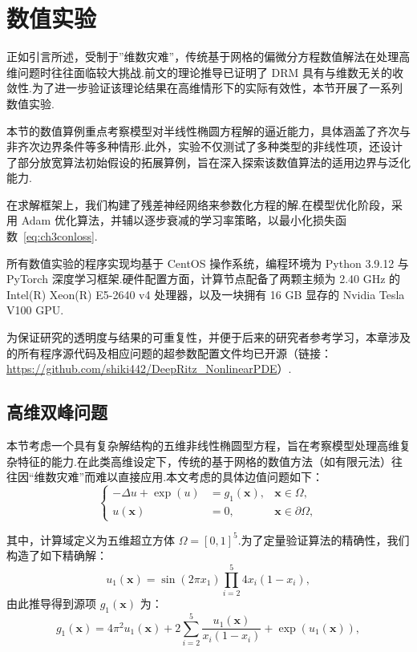\section{数值实验}\label{sec:num}
正如引言所述，受制于”维数灾难”，传统基于网格的偏微分方程数值解法在处理高维问题时往往面临较大挑战.前文的理论推导已证明了 DRM 具有与维数无关的收敛性.为了进一步验证该理论结果在高维情形下的实际有效性，本节开展了一系列数值实验.

本节的数值算例重点考察模型对半线性椭圆方程解的逼近能力，具体涵盖了齐次与非齐次边界条件等多种情形.此外，实验不仅测试了多种类型的非线性项，还设计了部分放宽算法初始假设的拓展算例，旨在深入探索该数值算法的适用边界与泛化能力.

在求解框架上，我们构建了残差神经网络来参数化方程的解.在模型优化阶段，采用 Adam 优化算法，并辅以逐步衰减的学习率策略，以最小化损失函数~\eqref{eq:ch3conloss}.

所有数值实验的程序实现均基于 CentOS 操作系统，编程环境为 Python 3.9.12 与 PyTorch 深度学习框架.硬件配置方面，计算节点配备了两颗主频为 2.40 GHz 的 Intel(R) Xeon(R) E5-2640 v4 处理器，以及一块拥有 16 GB 显存的 Nvidia Tesla V100 GPU.

为保证研究的透明度与结果的可重复性，并便于后来的研究者参考学习，本章涉及的所有程序源代码及相应问题的超参数配置文件均已开源（链接：\url{https://github.com/shiki442/DeepRitz_NonlinearPDE}）.

\subsection{高维双峰问题}
本节考虑一个具有复杂解结构的五维非线性椭圆型方程，旨在考察模型处理高维复杂特征的能力.在此类高维设定下，传统的基于网格的数值方法（如有限元法）往往因“维数灾难”而难以直接应用.本文考虑的具体边值问题如下：
\begin{equation}\label{eq:eq1}
\left\{\begin{aligned}
-\Delta u + \exp(u) & = g_1(\mathbf{x}), & \mathbf{x} \in \Omega, \\
u(\mathbf{x}) & = 0, & \mathbf{x} \in \partial\Omega,
\end{aligned}\right.
\end{equation}

其中，计算域定义为五维超立方体 $\Omega=[0,1]^5$.为了定量验证算法的精确性，我们构造了如下精确解：
$$u_1(\mathbf{x}) = \sin(2\pi x_1) \prod_{i=2}^{5} 4x_i(1-x_i),$$
由此推导得到源项 $g_1(\mathbf{x})$ 为：
$$g_1(\mathbf{x}) = 4\pi^2 u_1(\mathbf{x}) + 2\sum_{i=2}^{5} \frac{u_1(\mathbf{x})}{x_i(1-x_i)} + \exp(u_1(\mathbf{x})),$$

